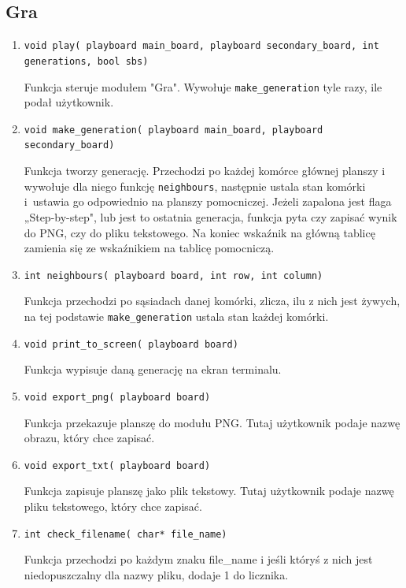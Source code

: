 \documentclass[12pt]{report}
\newcommand{\code}[1]{\texttt{#1}}
\begin{document}
\subsection{Gra}
\begin{enumerate}
    \item \code{void play( playboard main\_board, playboard secondary\_board, int generations, bool sbs)}\par
    Funkcja steruje modułem "Gra". Wywołuje \code{make\_generation} tyle razy, ile podał użytkownik. 
    \item \code{void make\_generation( playboard main\_board, playboard secondary\_board)}\par
    Funkcja tworzy generację. Przechodzi po każdej komórce głównej planszy i wywołuje dla niego funkcję \code{neighbours}, następnie ustala stan komórki i~ustawia go odpowiednio na planszy pomocniczej. Jeżeli zapalona jest flaga „Step-by-step", lub jest to ostatnia generacja, funkcja pyta czy zapisać wynik do PNG, czy do pliku tekstowego. Na koniec wskaźnik na główną tablicę zamienia się ze wskaźnikiem na tablicę pomocniczą.
    \item \code{int neighbours( playboard board, int row, int column)}\par
    Funkcja przechodzi po sąsiadach danej komórki, zlicza, ilu z nich jest żywych, na tej podstawie \code{make\_generation} ustala stan każdej komórki.
    \item \code{void print\_to\_screen( playboard board)}\par
    Funkcja wypisuje daną generację na ekran terminalu.
    \item \code{void export\_png( playboard board)}\par
    Funkcja przekazuje planszę do modułu PNG. Tutaj użytkownik podaje nazwę obrazu, który chce zapisać.
    \item \code{void export\_txt( playboard board)}\par
    Funkcja zapisuje planszę jako plik tekstowy. Tutaj użytkownik podaje nazwę pliku tekstowego, który chce zapisać.
    \item \code{int check\_filename( char* file\_name)}\par
    Funkcja przechodzi po każdym znaku file\_name i jeśli któryś z nich jest niedopuszczalny dla nazwy pliku, dodaje 1 do licznika.
\end{enumerate}
\end{document}
